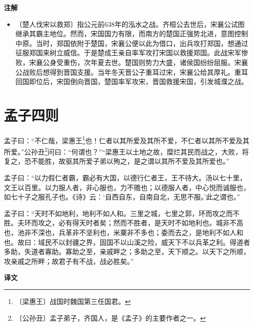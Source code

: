 \documentclass[12pt,UTF-8,openany,a4]{ctexbook}
\begin{document}
\newpage

\begin{Large}
    \noindent\textbf{注解}
\end{Large}


\vspace{-1em}

\begin{itemize}
    \setlength\itemsep{-0.2em}
    \item〔楚人伐宋以救郑〕{\yiwen 指公元前638年的泓水之战。齐桓公去世后，宋襄公试图继承其霸主地位。然而，宋国国力有限，而南方的楚国正强势北进，意图控制中原。当时，郑国依附于楚国，宋襄公便以此为借口，出兵攻打郑国，想通过征服郑国来树立威信。于是楚成王亲自率军攻打宋国以救援郑国。此战宋军惨败，宋襄公身受重伤，次年夏去世。楚国则势力大盛，诸侯国纷纷屈服。宋襄公战败后想得到晋国支援。当年冬天晋公子重耳过宋，宋襄公给其厚礼。重耳回国即位后，宋国倒向晋国，楚国率军攻宋，晋国救援宋国，引发城濮之战。}
\end{itemize}

\chapter{孟子四则}

\begin{large}
    
    孟子曰：“不仁哉，梁惠王\footnote{〔梁惠王〕\yiwen 战国时魏国第三任国君。}也！仁者以其所爱及其所不爱，不仁者以其所不爱及其所爱。”公孙丑\footnote{〔公孙丑〕\yiwen 孟子弟子，齐国人，是《孟子》的主要作者之一。}问曰：“何谓也？”“梁惠王以土地之故，糜烂其民而战之，大败，将复之，恐不能胜，故驱其所爱子弟以殉之，是之谓以其所不爱及其所爱也。”
    
    孟子曰：“以力假仁者霸，霸必有大国，以德行仁者王，王不待大。汤以七十里，文王以百里。以力服人者，非心服也，力不赡也；以德服人者，中心悦而诚服也，如七十子之服孔子也。《诗》云：‘自西自东，自南自北，无思不服。’此之谓也。”
    
    孟子曰：“天时不如地利，地利不如人和。三里之城，七里之郭，环而攻之而不胜。夫环而攻之，必有得天时者矣；然而不胜者，是天时不如地利也。城非不高也，池非不深也，兵革非不坚利也，米粟非不多也；委而去之，是地利不如人和也。故曰：域民不以封疆之界，固国不以山溪之险，威天下不以兵革之利。得道者多助，失道者寡助。寡助之至，亲戚畔之；多助之至，天下顺之。以天下之所顺，攻亲戚之所畔；故君子有不战，战必胜矣。”
\end{large}


\newpage

\begin{Large}
    \noindent\textbf{译文}
\end{Large}
\end{document}
